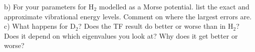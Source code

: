 \documentclass{article}
\begin{document}
\noindent b) For your parameters for H$_2$ modelled as a Morse potential. 
list the exact and approximate vibrational energy levels.  Comment on where the
largest errors are.
\\

\noindent c) What happens for D$_2$?  Does the TF result do better or worse than in H$_2$?  Does
it depend on which eigenvalues you look at?  Why does it get better or worse?
\\
\end{document}
